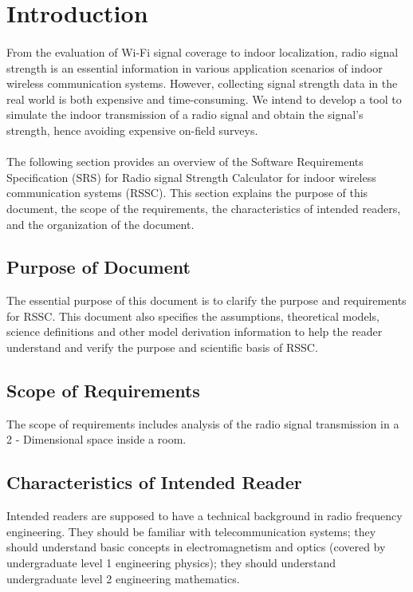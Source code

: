 \documentclass[12pt]{article}
\begin{document}
\newpage


\section{Introduction}

\paragraph{} From the evaluation of Wi-Fi signal coverage to indoor localization, 
radio signal strength is an essential information in various application scenarios 
of indoor wireless communication systems. However, collecting signal strength data 
in the real world is both expensive and time-consuming. We intend to develop a 
tool to simulate the indoor transmission of a radio signal and obtain the signal's strength, hence avoiding expensive on-field surveys.
\paragraph{} The following section provides an overview of the Software Requirements Specification (SRS) for Radio signal Strength Calculator for indoor wireless communication systems (RSSC). This section explains the purpose of this document, 
the scope of the requirements, the characteristics of intended readers, and the 
organization of the document.

\subsection{Purpose of Document}
The essential purpose of this document is to clarify the purpose and requirements 
for RSSC. This document also specifies the assumptions, theoretical models, science definitions and other model derivation information to help the reader understand 
and verify the purpose and scientific basis of RSSC.


\subsection{Scope of Requirements} 

  The scope of requirements includes analysis of the radio signal transmission 
  in a 2 - Dimensional space inside a room. 

\subsection{Characteristics of Intended Reader} \label{sec_IntendedReader}
  Intended readers are supposed to have a technical background in radio frequency 
  engineering. They should be familiar with telecommunication systems; they 
  should understand basic concepts in electromagnetism and optics (covered
  by undergraduate level 1 engineering physics); they should understand undergraduate 
  level 2 engineering mathematics.
\end{document}
